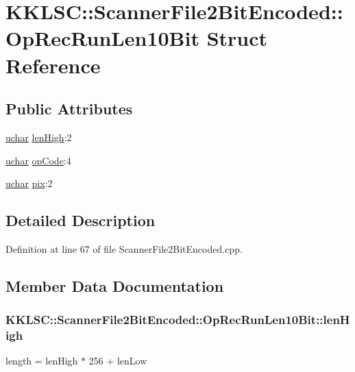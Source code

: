 \hypertarget{struct_scanner_file2_bit_encoded_1_1_op_rec_run_len10_bit}{}\section{K\+K\+L\+SC\+:\+:Scanner\+File2\+Bit\+Encoded\+:\+:Op\+Rec\+Run\+Len10\+Bit Struct Reference}
\label{struct_scanner_file2_bit_encoded_1_1_op_rec_run_len10_bit}
\subsection*{Public Attributes}
\begin{DoxyCompactItemize}
\item 
\hyperlink{namespace_k_k_b_ace9969169bf514f9ee6185186949cdf7}{uchar} \hyperlink{struct_scanner_file2_bit_encoded_1_1_op_rec_run_len10_bit_ac0fd4c0a2a72c78d70a8ac4107b5f388}{len\+High}\+:2
\item 
\hyperlink{namespace_k_k_b_ace9969169bf514f9ee6185186949cdf7}{uchar} \hyperlink{struct_scanner_file2_bit_encoded_1_1_op_rec_run_len10_bit_add92a54ef6b74294ef0c10e0c7f1c519}{op\+Code}\+:4
\item 
\hyperlink{namespace_k_k_b_ace9969169bf514f9ee6185186949cdf7}{uchar} \hyperlink{struct_scanner_file2_bit_encoded_1_1_op_rec_run_len10_bit_a4028ae8b94fd3e238358130131e0b428}{pix}\+:2
\end{DoxyCompactItemize}


\subsection{Detailed Description}


Definition at line 67 of file Scanner\+File2\+Bit\+Encoded.\+cpp.



\subsection{Member Data Documentation}
\subsubsection[{\texorpdfstring{len\+High}{lenHigh}}]{ K\+K\+L\+S\+C\+::\+Scanner\+File2\+Bit\+Encoded\+::\+Op\+Rec\+Run\+Len10\+Bit\+::len\+High}\hypertarget{struct_scanner_file2_bit_encoded_1_1_op_rec_run_len10_bit_ac0fd4c0a2a72c78d70a8ac4107b5f388}{}\label{struct_scanner_file2_bit_encoded_1_1_op_rec_run_len10_bit_ac0fd4c0a2a72c78d70a8ac4107b5f388}
length = len\+High $\ast$ 256 + len\+Low 

